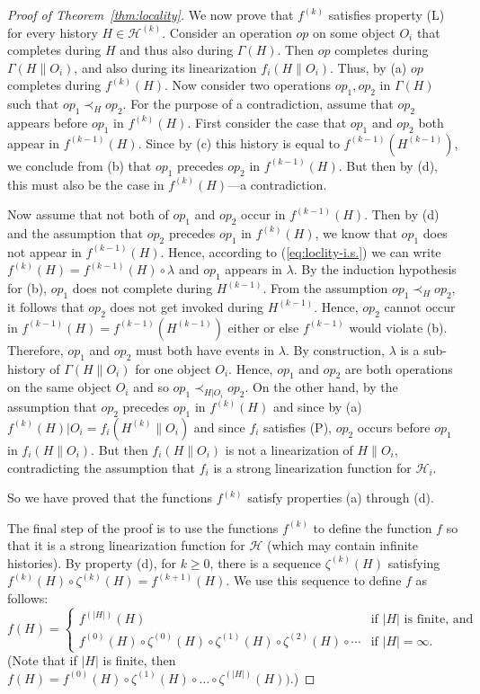 \documentclass[11pt,letterpaper]{article}
\newcommand{\HH}{\mathcal{H}}
\begin{document}
\begin{proof}[Proof of Theorem~\ref{thm:locality}]
We now prove that $f^{(k)}$ satisfies property (L) for every history $H\in\HH^{(k)}$.
Consider an operation $op$ on some object $O_i$ that completes during $H$ and thus also during $\Gamma(H)$.
Then $op$ completes during $\Gamma(H\|O_i)$, and also during its linearization $f_i(H\|{O_i})$.
Thus, by (a) $op$ completes during $f^{(k)}(H)$.
Now consider two operations $op_1,op_2$ in $\Gamma(H)$ such that $op_1\prec_{H} op_2$.
For the purpose of a contradiction, assume that $op_2$ appears before $op_1$ in $f^{(k)}(H)$.
First consider the case that $op_1$ and $op_2$ both appear in $f^{(k-1)}(H)$.
Since by (c) this history is equal to $f^{(k-1)}(H^{(k-1)})$, we conclude from (b) that $op_1$ precedes $op_2$ in $f^{(k-1)}(H)$.
But then by (d), this must also be the case in $f^{(k)}(H)$---a contradiction.

Now assume that not both of $op_1$ and $op_2$ occur in $f^{(k-1)}(H)$.
Then by (d) and the assumption that $op_2$ precedes $op_1$ in $f^{(k)}(H)$, we know that $op_1$ does not appear in $f^{(k-1)}(H)$.
Hence, according to (\ref{eq:loclity-i.s.}) we can write $f^{(k)}(H)=f^{(k-1)}(H)\circ\lambda$ and $op_1$ appears in $\lambda$.
By the induction hypothesis for (b), $op_1$ does not complete during $H^{(k-1)}$.
From the assumption $op_1\prec_H op_2$, it follows that $op_2$ does not get invoked during $H^{(k-1)}$.
Hence, $op_2$ cannot occur in $f^{(k-1)}(H)=f^{(k-1)}(H^{(k-1)})$ either or else $f^{(k-1)}$ would violate (b).
Therefore, $op_1$ and $op_2$ must both have events in $\lambda$.
By construction, $\lambda$ is a sub-history of $\Gamma(H\|O_i)$ for one object $O_i$.
Hence, $op_1$ and $op_2$ are both operations on the same object $O_i$ and so $op_1\prec_{H|O_i} op_2$.
On the other hand, by the assumption that $op_2$ precedes $op_1$ in $f^{(k)}(H)$ and since by (a) $f^{(k)}(H)|O_i=f_i(H^{(k)}\|O_i)$ and since $f_i$ satisfies (P), $op_2$ occurs before $op_1$ in $f_i(H\|O_i)$.
But then $f_i(H\|O_i)$ is not a linearization of $H\|O_i$, contradicting the assumption that $f_i$ is a strong linearization function for $\HH_i$.

So we have proved that the functions $f^{(k)}$ satisfy properties (a) through (d).

The final step of the proof is to use the functions $f^{(k)}$ to define the function $f$ so that it is
a strong linearization function for $\HH$ (which may contain infinite histories).
By property (d), for $k\geq 0$, there is a sequence $\zeta^{(k)}(H)$ satisfying
$f^{(k)}(H)\circ\zeta^{(k)}(H)=f^{(k+1)}(H)$.
We use this sequence to define $f$ as follows:
\begin{displaymath}
  f(H)=
  \begin{cases}
    f^{(|H|)}(H) &\text{if $|H|$ is finite, and}\\
    f^{(0)}(H)\circ\zeta^{(0)}(H)\circ \zeta^{(1)}(H)\circ \zeta^{(2)}(H)\circ\cdots & \text{if $|H|=\infty$.}
  \end{cases}
\end{displaymath}
(Note that if $|H|$ is finite, then $f(H)=f^{(0)}(H)\circ \zeta^{(1)}(H)\circ\dots\circ\zeta^{(|H|)}(H))$.)


\end{proof}
\end{document}
